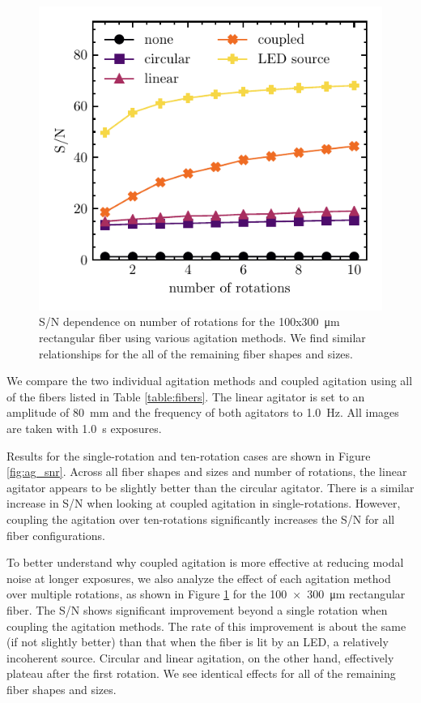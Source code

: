 \documentclass[twocolumn]{emulateapj}
\begin{document}
\begin{figure}
\centering
	\includegraphics[width=\columnwidth]{rect_snr_vs_time.pdf}
	\caption{S/N dependence on number of rotations for the 100x\SI{300}{\micro\meter} rectangular fiber using various agitation methods. We find similar relationships for the all of the remaining fiber shapes and sizes.}
\label{fig:rect_snr_vs_time}
\end{figure}

We compare the two individual agitation methods and coupled agitation using all of the fibers listed in Table \ref{table:fibers}. The linear agitator is set to an amplitude of \SI{80}{\milli\meter} and the frequency of both agitators to \SI{1.0}{\hertz}. All images are taken with \SI{1.0}{\second} exposures.

Results for the single-rotation and ten-rotation cases are shown in Figure \ref{fig:ag_snr}. Across all fiber shapes and sizes and number of rotations, the linear agitator appears to be slightly better than the circular agitator. There is a similar increase in S/N when looking at coupled agitation in single-rotations. However, coupling the agitation over ten-rotations significantly increases the S/N for all fiber configurations.

To better understand why coupled agitation is more effective at reducing modal noise at longer exposures, we also analyze the effect of each agitation method over multiple rotations, as shown in Figure \ref{fig:rect_snr_vs_time} for the \SI{100x300}{\micro\meter} rectangular fiber. The S/N shows significant improvement beyond a single rotation when coupling the agitation methods. The rate of this improvement is about the same (if not slightly better) than that when the fiber is lit by an LED, a relatively incoherent source. Circular and linear agitation, on the other hand, effectively plateau after the first rotation. We see identical effects for all of the remaining fiber shapes and sizes.
\end{document}
